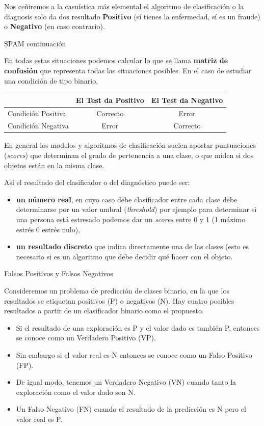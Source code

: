 \documentclass[
  letterpaper,
  DIV=11,
  numbers=noendperiod]{scrreprt}
\providecommand{\tightlist}{%
  \setlength{\itemsep}{0pt}\setlength{\parskip}{0pt}}\usepackage{longtable,booktabs,array}
\begin{document}
Nos ceñiremos a la casuística más elemental el algoritmo de
clasificación o la diagnosis solo da dos resultado \textbf{Positivo} (sí
tienes la enfermedad, sí es un fraude) o \textbf{Negativo} (en caso
contrario).

SPAM continuación

En todas estas situaciones podemos calcular lo que se llama
\textbf{matriz de confusión} que representa todas las situaciones
posibles. En el caso de estudiar una condición de tipo binario,

\begin{longtable}[]{@{}lcc@{}}
\toprule\noalign{}
& El Test da Positivo & El Test da Negativo \\
\midrule\noalign{}
\endhead
\bottomrule\noalign{}
\endlastfoot
Condición Positiva & Correcto & Error \\
Condición Negativa & Error & Correcto \\
\end{longtable}

En general los modelos y algoritmos de clasificación suelen aportar
puntuaciones (\emph{scores}) que determinan el grado de pertenencia a
una clase, o que miden si dos objetos están en la misma clase.

Así el resultado del clasificador o del diagnóstico puede ser:

\begin{itemize}
\tightlist
\item
  \textbf{un número real}, en cuyo caso debe clasificador entre cada
  clase debe determinarse por un valor umbral (\emph{threshold}) por
  ejemplo para determinar si una persona está estresado podemos dar un
  \emph{scores} entre 0 y 1 (1 máximo estrés 0 estrés nulo),
\item
  \textbf{un resultado discreto} que indica directamente una de las
  clases (esto es necesario si es un algoritmo que debe decidir qué
  hacer con el objeto.
\end{itemize}

\begin{Ejemplo}{Falsos Positivos y Falsos Negativos}{}

Consideremos un problema de predicción de clases binario, en la que los
resultados se etiquetan positivos (P) o negativos (N). Hay cuatro
posibles resultados a partir de un clasificador binario como el
propuesto.

\begin{itemize}
\tightlist
\item
  Si el resultado de una exploración es P y el valor dado es también P,
  entonces se conoce como un Verdadero Positivo (VP).
\item
  Sin embargo si el valor real es N entonces se conoce como un Falso
  Positivo (FP).
\item
  De igual modo, tenemos un Verdadero Negativo (VN) cuando tanto la
  exploración como el valor dado son N.
\item
  Un Falso Negativo (FN) cuando el resultado de la predicción es N pero
  el valor real es P.
\end{itemize}

\end{Ejemplo}
\end{document}

